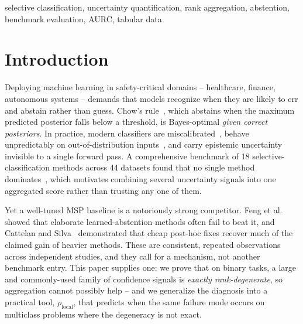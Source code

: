 \documentclass[conference]{IEEEtran}
\newcommand{\rholocal}{\rho_{\mathrm{local}}}
\begin{document}
\begin{IEEEkeywords}
selective classification, uncertainty quantification, rank aggregation, abstention, benchmark evaluation, AURC, tabular data
\end{IEEEkeywords}

\section{Introduction}
\label{sec:intro}

Deploying machine learning in safety-critical domains -- healthcare, finance, autonomous systems -- demands that models recognize when they are likely to err and abstain rather than guess. Chow's rule~\cite{chow1970}, which abstains when the maximum predicted posterior falls below a threshold, is Bayes-optimal \emph{given correct posteriors}. In practice, modern classifiers are miscalibrated~\cite{guo2017calibration}, behave unpredictably on out-of-distribution inputs~\cite{liu2020energy}, and carry epistemic uncertainty invisible to a single forward pass. A comprehensive benchmark of 18 selective-classification methods across 44 datasets found that no single method dominates~\cite{pugnana2024benchmark}, which motivates combining several uncertainty signals into one aggregated score rather than trusting any one of them.

Yet a well-tuned MSP baseline is a notoriously strong competitor. Feng et al.~\cite{feng2023better} showed that elaborate learned-abstention methods often fail to beat it, and Cattelan and Silva~\cite{cattelan2023logitnorm} demonstrated that cheap post-hoc fixes recover much of the claimed gain of heavier methods. These are consistent, repeated observations across independent studies, and they call for a mechanism, not another benchmark entry. This paper supplies one: we prove that on binary tasks, a large and commonly-used family of confidence signals is \emph{exactly rank-degenerate}, so aggregation cannot possibly help -- and we generalize the diagnosis into a practical tool, $\rholocal$, that predicts when the same failure mode occurs on multiclass problems where the degeneracy is not exact.
\end{document}
